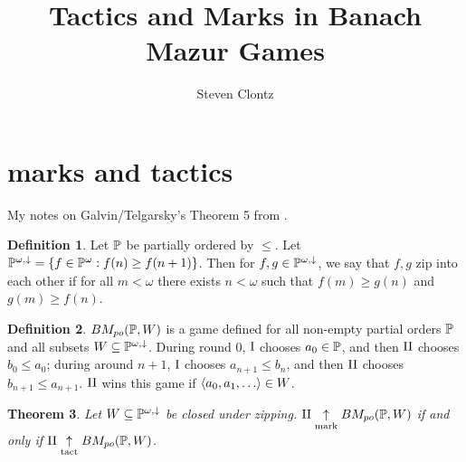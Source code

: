 \documentclass[11pt]{article}
\title{Tactics and Marks in Banach Mazur Games}
\author{Steven Clontz}
\theoremstyle{plain}
\newtheorem{theorem}{Theorem}
\theoremstyle{definition}
\newtheorem{definition}[theorem]{Definition}
\theoremstyle{remark}
\theoremstyle{plain}
\theoremstyle{definition}
\theoremstyle{remark}
\newcommand{\bmPoGame}[2]{BM_{po}(#1,#2)}
\begin{document}
\maketitle

  \section*{marks and tactics}

  My notes on Galvin/Telgarsky's Theorem 5 from \cite{MR831181}.

  \begin{definition}
    Let \(\mathbb{P}\) be partially ordered by \(\leq\).
    Let \(\mathbb{P}^{\omega,\downarrow}=\{f\in\mathbb{P}^\omega : f(n)\geq f(n+1)\}\).
    Then for \(f,g\in\mathbb{P}^{\omega,\downarrow}\), we say that \(f,g\) zip into each
    other if for all \(m<\omega\) there exists \(n<\omega\) such that
    \(f(m)\geq g(n)\) and \(g(m)\geq f(n)\).
  \end{definition}

  \begin{definition}
    \(\bmPoGame{\mb P}{W}\) is a game defined for all non-empty partial orders
    \(\mathbb{P}\) and all subsets \(W\subseteq\mathbb{P}^{\omega,\downarrow}\).
    During round \(0\), \(\mathrm{I}\) chooses \(a_0\in\mathbb{P}\),
    and then \(\mathrm{II}\) chooses \(b_0\leq a_0\); during around \(n+1\),
    \(\mathrm{I}\) chooses \(a_{n+1}\leq b_n\), and then \(\mathrm{II}\) chooses
    \(b_{n+1}\leq a_{n+1}\). \(\mathrm{II}\) wins this game if
    \(\<a_0,a_1,\dots\>\in W\).
  \end{definition}

  \begin{theorem}
    Let \(W\subseteq\mathbb{P}^{\omega,\downarrow}\) be closed under zipping.
    \(\plII\markwin\bmPoGame{\mb P}{W}\) if and only if
    \(\plII\tactwin\bmPoGame{\mb P}{W}\).
  \end{theorem}
\end{document}
